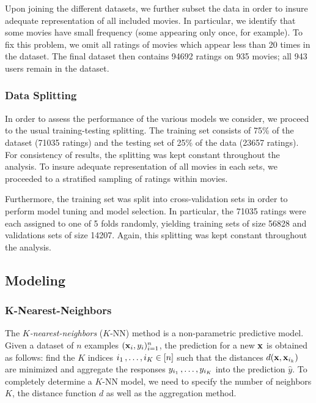 \documentclass[bj, preprint]{imsart}
\begin{document}
Upon joining the different datasets, we further subset the data in order to insure adequate representation of all included movies. 
In particular, we identify that some movies have small frequency (some appearing only once, for example). 
To fix this problem, we omit all ratings of movies which appear less than 20 times in the dataset. 
The final dataset then contains \num{94692} ratings on \num{935} movies; all \num{943} users remain in the dataset.

\subsubsection{Data Splitting}\label{subsubsec:method.preprocess.split}

In order to assess the performance of the various models we consider, we proceed to the usual training-testing splitting. 
The training set consists of 75\% of the dataset (\num{71035} ratings) and the testing set of 25\% of the data (\num{23657} ratings). 
For consistency of results, the splitting was kept constant throughout the analysis.
To insure adequate representation of all movies in each sets, we proceeded to a stratified sampling of ratings within movies.

Furthermore, the training set was split into cross-validation sets in order to perform model tuning and model selection. 
In particular, the \num{71035} ratings were each assigned to one of 5 folds randomly, yielding training sets of size \num{56828} and validations sets of size \num{14207}. 
Again, this splitting was kept constant throughout the analysis.

\subsection{Modeling}\label{subsec:method.models}

\subsubsection{K-Nearest-Neighbors}\label{subsubsec:method.models.knn}

The \textit{$K$-nearest-neighbors} ($K$-NN) method is a non-parametric predictive model. 
Given a dataset of $n$ examples $(\operatorname{\mathbf x}_i, y_i)_{i=1}^n$, the prediction for a new $\operatorname{\mathbf x}$ is obtained as follows: find the $K$ indices $i_1\operatorname{,\ldots ,} i_K\in[n]$ such that the distances $d(\operatorname{\mathbf x}, \operatorname{\mathbf x}_{i_k})$ are minimized and aggregate the responses $y_{i_1}\operatorname{,\ldots ,} y_{i_K}$ into the prediction $\hat{y}$.
To completely determine a $K$-NN model, we need to specify the number of neighbors $K$, the distance function $d$ as well as the aggregation method.
\end{document}
